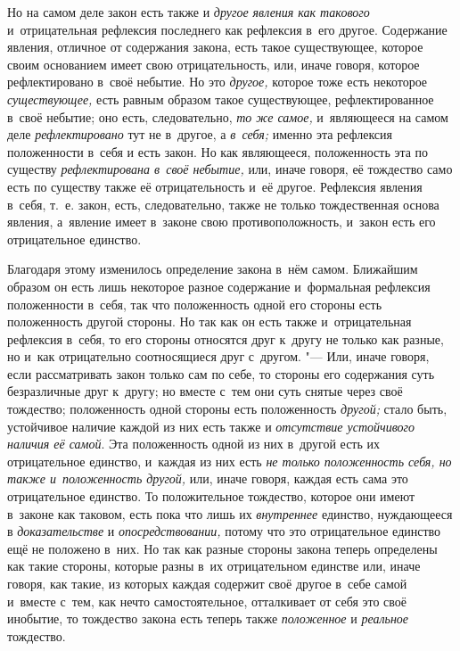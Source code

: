 Но на самом деле закон есть также и {\em другое явления
как такового} и~отрицательная рефлексия последнего как рефлексия в~его
другое. Содержание явления, отличное от содержания закона, есть такое
существующее, которое своим основанием имеет свою отрицательность, или,
иначе говоря, которое рефлектировано в~своё небытие. Но это
{\em другое,} которое тоже есть некоторое
{\em существующее,} есть равным образом такое
существующее, рефлектированное в~своё небытие; оно есть, следовательно,
{\em то же самое,} и~являющееся на самом деле
{\em рефлектировано} тут не в~другое, а
{\em в~себя;} именно эта рефлексия положенности в~себя
и есть закон. Но как являющееся, положенность эта по существу
{\em рефлектирована в~своё небытие,} или, иначе говоря,
её тождество само есть по существу также её отрицательность и~её другое.
Рефлексия явления в~себя, т.~е. закон, есть, следовательно, также не только
тождественная основа явления, а~явление имеет в~законе свою
противоположность, и~закон есть его отрицательное единство.

Благодаря этому изменилось определение закона в~нём самом. Ближайшим образом
он есть лишь некоторое разное содержание и~формальная рефлексия
положенности в~себя, так что положенность одной его стороны есть
положенность другой стороны. Но так как он есть также и~отрицательная
рефлексия в~себя, то его стороны относятся друг к~другу не только как
разные, но и~как отрицательно соотносящиеся друг с~другом. "--- Или, иначе
говоря, если рассматривать закон только сам по себе, то стороны его
содержания суть безразличные друг к~другу; но вместе с~тем они суть снятые
через своё тождество; положенность одной стороны есть положенность
{\em другой;} стало быть, устойчивое наличие каждой из
них есть также и {\em отсутствие устойчивого наличия её
самой}. Эта положенность одной из них в~другой есть их отрицательное
единство, и~каждая из них есть {\em не только
положенность себя, но также и~положенность другой,} или, иначе говоря,
каждая есть сама это отрицательное единство. То положительное тождество,
которое они имеют в~законе как таковом, есть пока что лишь их
{\em внутреннее} единство, нуждающееся в
{\em доказательстве} и
{\em опосредствовании,} потому что это отрицательное
единство ещё не положено в~них. Но так как разные стороны закона теперь
определены как такие стороны, которые разны в~их отрицательном единстве
или, иначе говоря, как такие, из которых каждая содержит своё другое в~себе
самой и~вместе с~тем, как нечто самостоятельное, отталкивает от себя это
своё инобытие, то тождество закона есть теперь также
{\em положенное} и {\em реальное}
тождество.


